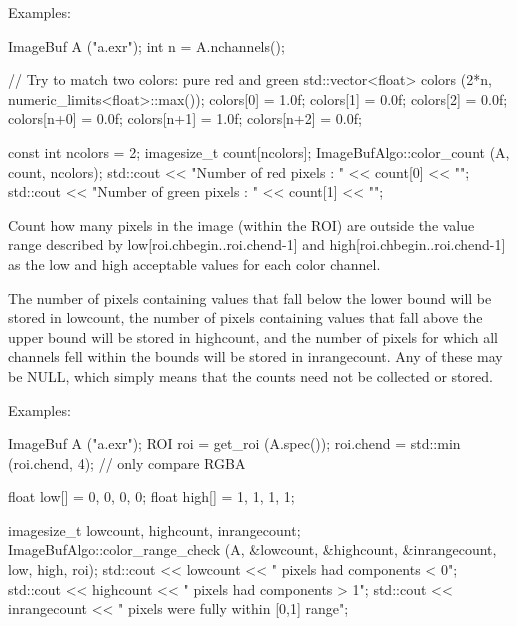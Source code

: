 \smallskip
\noindent Examples:
\begin{code}
    ImageBuf A ("a.exr");
    int n = A.nchannels();

    // Try to match two colors: pure red and green
    std::vector<float> colors (2*n, numeric_limits<float>::max());
    colors[0] = 1.0f; colors[1] = 0.0f; colors[2] = 0.0f;
    colors[n+0] = 0.0f; colors[n+1] = 1.0f; colors[n+2] = 0.0f;

    const int ncolors = 2;
    imagesize_t count[ncolors];
    ImageBufAlgo::color_count (A, count, ncolors);
    std::cout << "Number of red pixels   : " << count[0] << "\n";
    std::cout << "Number of green pixels : " << count[1] << "\n";
\end{code}
\apiend


 

Count how many pixels in the image (within the ROI) are outside the
value range described by {\cf low[roi.chbegin..roi.chend-1]} and
{\cf high[roi.chbegin..roi.chend-1]} 
as the low and high acceptable values for each color channel.  

The number of pixels containing values that fall below the lower bound
will be stored in {\cf *lowcount}, the number of pixels containing
values that fall above the upper bound will be stored in 
{\cf *highcount}, and the number of pixels for which all channels fell
within the bounds will be stored in {\cf *inrangecount}.  Any of these
may be NULL, which simply means that the counts need not be collected or
stored.

\smallskip
\noindent Examples:
\begin{code}
    ImageBuf A ("a.exr");
    ROI roi = get_roi (A.spec());
    roi.chend = std::min (roi.chend, 4);  // only compare RGBA

    float low[] = {0, 0, 0, 0};
    float high[] = {1, 1, 1, 1};

    imagesize_t lowcount, highcount, inrangecount;
    ImageBufAlgo::color_range_check (A, &lowcount, &highcount, &inrangecount,
                                     low, high, roi);
    std::cout << lowcount << " pixels had components < 0\n";
    std::cout << highcount << " pixels had components > 1\n";
    std::cout << inrangecount << " pixels were fully within [0,1] range\n";
\end{code}
\apiend


